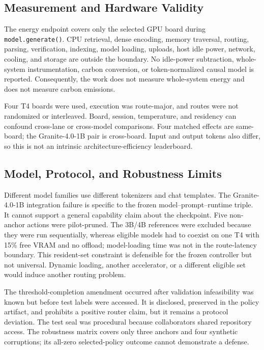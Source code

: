\subsection{Measurement and Hardware Validity}

The energy endpoint covers only the selected GPU board during
\texttt{model.generate()}. CPU retrieval, dense encoding, memory traversal, routing,
parsing, verification, indexing, model loading, uploads, host idle power, network,
cooling, and storage are outside the boundary. No idle-power subtraction,
whole-system instrumentation, carbon conversion, or token-normalized causal model
is reported. Consequently, the work does not measure whole-system energy and does
not measure carbon emissions.

Four T4 boards were used, execution was route-major, and routes were not randomized
or interleaved. Board, session, temperature, and residency can confound cross-lane
or cross-model comparisons. Four matched effects are same-board; the
Granite-4.0-1B pair is cross-board. Input and output tokens also differ, so this is
not an intrinsic architecture-efficiency leaderboard.

\subsection{Model, Protocol, and Robustness Limits}

Different model families use different tokenizers and chat templates. The
Granite-4.0-1B integration failure is specific to the frozen
model--prompt--runtime triple. It cannot support a general capability claim about
the checkpoint. Five non-anchor actions were pilot-pruned. The 3B/4B references
were excluded because they were run sequentially, whereas eligible models had to
coexist on one T4 with 15\% free VRAM and no offload; model-loading time was not in
the route-latency boundary. This resident-set constraint is defensible for the
frozen controller but not universal. Dynamic loading, another accelerator, or a
different eligible set would induce another routing problem.

The threshold-completion amendment occurred after validation infeasibility was
known but before test labels were accessed. It is disclosed, preserved in the
policy artifact, and prohibits a positive router claim, but it remains a protocol
deviation. The test seal was procedural because collaborators shared repository
access. The robustness matrix covers only three anchors and four synthetic
corruptions; its all-zero selected-policy outcome cannot demonstrate a defense.


